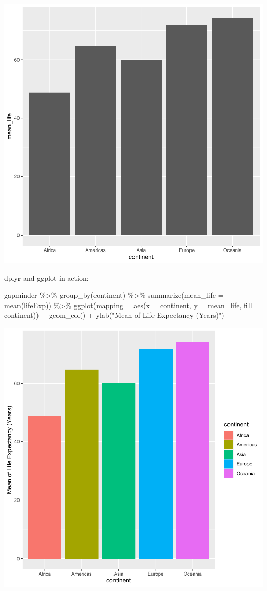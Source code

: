 \documentclass[
]{book}
\makeatletter
\newenvironment{Shaded}{\begin{snugshade}}{\end{snugshade}}
\newcommand{\AttributeTok}[1]{\textcolor[rgb]{0.61,0.61,0.61}{#1}}
\newcommand{\FunctionTok}[1]{\textcolor[rgb]{0,0,0}{#1}}
\newcommand{\NormalTok}[1]{#1}
\newcommand{\SpecialCharTok}[1]{\textcolor[rgb]{0,0,0}{#1}}
\newcommand{\StringTok}[1]{\textcolor[rgb]{0.5,0.5,0.5}{#1}}
\newenvironment{kframe}{%
\medskip{}
\setlength{\fboxsep}{.8em}
 \def\at@end@of@kframe{}%
 \ifinner\ifhmode%
  \def\at@end@of@kframe{\end{minipage}}%
  \begin{minipage}{\columnwidth}%
 \fi\fi%
 \def\FrameCommand##1{\hskip\@totalleftmargin \hskip-\fboxsep
 \colorbox{shadecolor}{##1}\hskip-\fboxsep
     \hskip-\linewidth \hskip-\@totalleftmargin \hskip\columnwidth}%
 \MakeFramed {\advance\hsize-\width
   \@totalleftmargin\z@ \linewidth\hsize
   \@setminipage}}%
 {\par\unskip\endMakeFramed%
 \at@end@of@kframe}
\renewenvironment{Shaded}{\begin{kframe}}{\end{kframe}}
\makeatother
\begin{document}
\begin{center}\includegraphics[width=0.7\linewidth,keepaspectratio]{Multivariable_Data_Analysis_files/figure-latex/unnamed-chunk-70-1} \end{center}

dplyr and ggplot in action:

\begin{Shaded}
\begin{Highlighting}[]
\NormalTok{gapminder }\SpecialCharTok{\%\textgreater{}\%} \FunctionTok{group\_by}\NormalTok{(continent) }\SpecialCharTok{\%\textgreater{}\%} \FunctionTok{summarize}\NormalTok{(}\AttributeTok{mean\_life =} \FunctionTok{mean}\NormalTok{(lifeExp)) }\SpecialCharTok{\%\textgreater{}\%} 
  \FunctionTok{ggplot}\NormalTok{(}\AttributeTok{mapping =} \FunctionTok{aes}\NormalTok{(}\AttributeTok{x =}\NormalTok{ continent, }\AttributeTok{y =}\NormalTok{ mean\_life, }\AttributeTok{fill =}\NormalTok{ continent)) }\SpecialCharTok{+} \FunctionTok{geom\_col}\NormalTok{() }\SpecialCharTok{+}
  \FunctionTok{ylab}\NormalTok{(}\StringTok{"Mean of Life Expectancy (Years)"}\NormalTok{)}
\end{Highlighting}
\end{Shaded}

\begin{center}\includegraphics[width=0.7\linewidth,keepaspectratio]{Multivariable_Data_Analysis_files/figure-latex/unnamed-chunk-71-1} \end{center}
\end{document}
